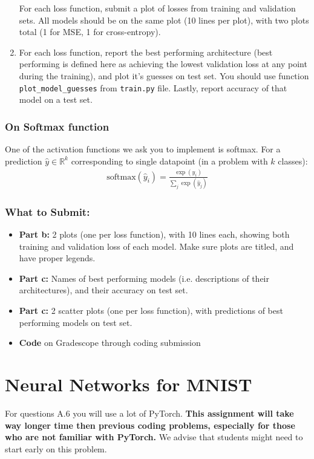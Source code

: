 \documentclass{article}
\begin{document}
\begin{aprob}
\begin{enumerate}
\begin{itemize}
        \end{itemize}
        For each loss function, submit a plot of losses from training and validation sets. All models should be on the same plot (10 lines per plot), with two plots total (1 for MSE, 1 for cross-entropy).
        \item {} For each loss function, report the best performing architecture (best performing is defined here as achieving the lowest validation loss at any point during the training), and plot it's guesses on test set. You should use function \texttt{plot\_model\_guesses} from \texttt{train.py} file. Lastly, report accuracy of that model on a test set.
    \end{enumerate}
    
    \subsubsection*{On Softmax function}
    One of the activation functions we ask you to implement is softmax. For a prediction $\hat{y} \in \mathbb{R}^k$ corresponding to single datapoint (in a problem with $k$ classes):
    \begin{align*}
        \text{softmax}(\hat{y}_i) = \frac{\exp(\hat{y}_i)}{\sum_j \exp(\hat{y}_j)}
    \end{align*}
    
    \subsubsection*{What to Submit:}
    \begin{itemize}
        \item \textbf{Part b:} 2 plots (one per loss function), with 10 lines each, showing both training and validation loss of each model. Make sure plots are titled, and have proper legends.
        \item \textbf{Part c:} Names of best performing models (i.e. descriptions of their architectures), and their accuracy on test set.
        \item \textbf{Part c:} 2 scatter plots (one per loss function), with predictions of best performing models on test set.
        \item \textbf{Code} on Gradescope through coding submission
    \end{itemize}
\end{aprob}
\fi

\section*{Neural Networks for MNIST}
For questions A.6 you will use a lot of PyTorch.
        \textbf{This assignment will take way longer time then previous coding problems, especially for those who are not familiar with PyTorch.} We advise that students might need to start early on this problem.
\end{document}
